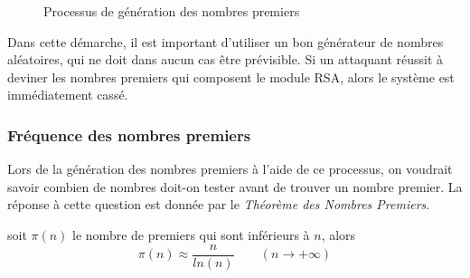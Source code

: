 		\begin{figure}[H]
			\begin{center}
			\end{center}
			\caption{Processus de génération des nombres premiers}\label{fig:M2}
		\end{figure}
		Dans cette démarche, il est important d'utiliser un bon générateur de nombres aléatoires, qui ne doit dans aucun cas être prévisible. Si un attaquant réussit à deviner les nombres premiers qui composent le module RSA, alors le système est immédiatement cassé.
	
		\subsubsection*{Fréquence des nombres premiers}
		Lors de la génération des nombres premiers à l'aide de ce processus, on voudrait savoir combien de nombres doit-on tester avant de trouver un nombre premier. La réponse à cette question est donnée par le \textit{Théorème des Nombres Premiers}.
		
			\vspace{-1.5em}\begin{adjustwidth}{1.5cm}{1.5cm} 
			\begin{Th}
				soit $\pi(n)$ le nombre de premiers qui sont inférieurs à $n$, alors
				\[\pi(n) \approx \frac{n}{ln(n)} \quad \quad (n \to +\infty)\]
			\end{Th}
			\end{adjustwidth}\vspace{0.5em}
			

